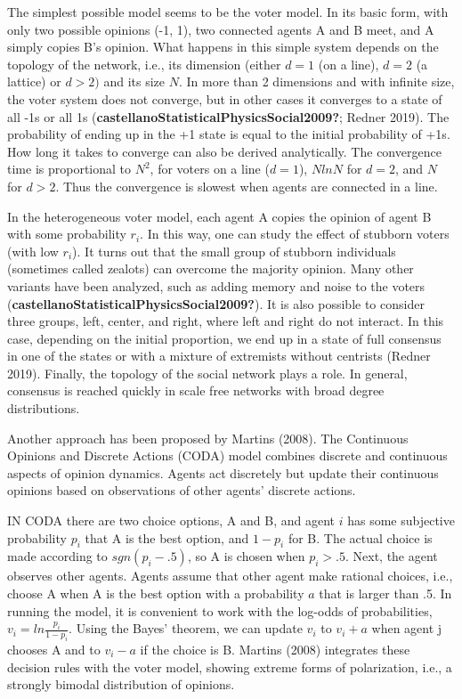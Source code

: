 \documentclass[
  a4paper,
  DIV=11,
  numbers=noendperiod,
  oneside]{scrreprt}
\begin{document}
The simplest possible model seems to be the voter model. In its basic
form, with only two possible opinions (-1, 1), two connected agents A
and B meet, and A simply copies B's opinion. What happens in this simple
system depends on the topology of the network, i.e., its dimension
(either \(d = 1\) (on a line), \(d = 2\) (a lattice) or \(d > 2)\) and
its size \(N\). In more than 2 dimensions and with infinite size, the
voter system does not converge, but in other cases it converges to a
state of all -1s or all 1s
(\textbf{castellanoStatisticalPhysicsSocial2009?}; Redner 2019). The
probability of ending up in the +1 state is equal to the initial
probability of +1s. How long it takes to converge can also be derived
analytically. The convergence time is proportional to \(N^{2}\), for
voters on a line (\(d = 1\)), \(NlnN\) for \(d = 2\), and \(N\) for
\(d > 2\). Thus the convergence is slowest when agents are connected in
a line.

In the heterogeneous voter model, each agent A copies the opinion of
agent B with some probability \(r_{i}\). In this way, one can study the
effect of stubborn voters (with low \(r_{i}\)). It turns out that the
small group of stubborn individuals (sometimes called zealots) can
overcome the majority opinion. Many other variants have been analyzed,
such as adding memory and noise to the voters
(\textbf{castellanoStatisticalPhysicsSocial2009?}). It is also possible
to consider three groups, left, center, and right, where left and right
do not interact. In this case, depending on the initial proportion, we
end up in a state of full consensus in one of the states or with a
mixture of extremists without centrists (Redner 2019). Finally, the
topology of the social network plays a role. In general, consensus is
reached quickly in scale free networks with broad degree distributions.

Another approach has been proposed by Martins (2008). The Continuous
Opinions and Discrete Actions (CODA) model combines discrete and
continuous aspects of opinion dynamics. Agents act discretely but update
their continuous opinions based on observations of other agents'
discrete actions.

IN CODA there are two choice options, A and B, and agent \(i\) has some
subjective probability \(p_{i}\) that A is the best option, and
\({1 - p}_{i}\) for B. The actual choice is made according to
\(sgn\left( p_{i} - .5 \right)\), so A is chosen when \(p_{i} > .5\).
Next, the agent observes other agents. Agents assume that other agent
make rational choices, i.e., choose A when A is the best option with a
probability \(a\) that is larger than .5. In running the model, it is
convenient to work with the log-odds of probabilities,
\(v_{i} = ln\frac{p_{i}}{1 - p_{i}}\). Using the Bayes' theorem, we can
update \(v_{i}\) to \(v_{i} + a\) when agent j chooses A and to
\(v_{i} - a\) if the choice is B. Martins (2008) integrates these
decision rules with the voter model, showing extreme forms of
polarization, i.e., a strongly bimodal distribution of opinions.
\end{document}
